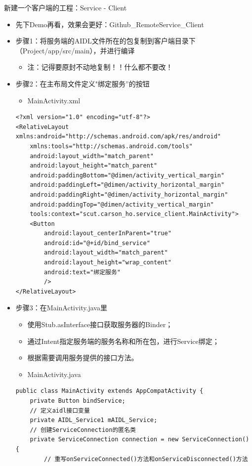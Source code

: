 \documentclass[9pt, b5paper]{article}
\begin{document}
新建一个客户端的工程：Service - Client
\begin{itemize}
\item 先下Demo再看，效果会更好：Github\_RemoteService\_Client
\item 步骤1：将服务端的AIDL文件所在的包复制到客户端目录下（Project/app/src/main），并进行编译
\begin{itemize}
\item 注：记得要原封不动地复制！！什么都不要改！
\end{itemize}
\item 步骤2：在主布局文件定义"绑定服务”的按钮
\begin{itemize}
\item MainActivity.xml
\end{itemize}
\begin{verbatim}
<?xml version="1.0" encoding="utf-8"?>
<RelativeLayout xmlns:android="http://schemas.android.com/apk/res/android"
    xmlns:tools="http://schemas.android.com/tools"
    android:layout_width="match_parent"
    android:layout_height="match_parent"
    android:paddingBottom="@dimen/activity_vertical_margin"
    android:paddingLeft="@dimen/activity_horizontal_margin"
    android:paddingRight="@dimen/activity_horizontal_margin"
    android:paddingTop="@dimen/activity_vertical_margin"
    tools:context="scut.carson_ho.service_client.MainActivity">
    <Button
        android:layout_centerInParent="true"
        android:id="@+id/bind_service"
        android:layout_width="match_parent"
        android:layout_height="wrap_content"
        android:text="绑定服务"
        />
</RelativeLayout>
\end{verbatim}
\item 步骤3：在MainActivity.java里
\begin{itemize}
\item 使用Stub.asInterface接口获取服务器的Binder；
\item 通过Intent指定服务端的服务名称和所在包，进行Service绑定；
\item 根据需要调用服务提供的接口方法。
\item MainActivity.java
\end{itemize}
\begin{verbatim}
public class MainActivity extends AppCompatActivity {
    private Button bindService;
    // 定义aidl接口变量
    private AIDL_Service1 mAIDL_Service;
    // 创建ServiceConnection的匿名类
    private ServiceConnection connection = new ServiceConnection() {
        // 重写onServiceConnected()方法和onServiceDisconnected()方法

\end{verbatim}
\end{itemize}
\end{document}
